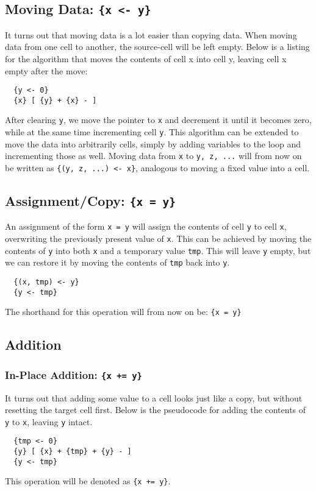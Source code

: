 \subsection{Moving Data: \texttt{\{x <- y\}}}
It turns out that moving data is a lot easier than copying data. When moving data from one cell to another, the source-cell will be left empty. Below is a listing for the algorithm that moves the contents of cell x into cell y, leaving cell x empty after the move:
\begin{lstlisting}
  {y <- 0} 
  {x} [ {y} + {x} - ]
\end{lstlisting}
After clearing \texttt{y}, we move the pointer to \texttt{x} and decrement it until it becomes zero, while at the same time incrementing cell \texttt{y}. This algorithm can be extended to move the data into arbitrarily cells, simply by adding variables to the loop and incrementing those as well. Moving data from \texttt{x} to \texttt{y, z, ...} will from now on be written as \texttt{\{(y, z, ...) <- x\}}, analogous to moving a fixed value into a cell.

\subsection{Assignment/Copy: \texttt{\{x = y\}}}
An assignment of the form \texttt{x = y} will assign the contents of cell \texttt{y} to cell \texttt{x}, overwriting the previously present value of \texttt{x}. This can be achieved by moving the contents of \texttt{y} into both \texttt{x} and a temporary value \texttt{tmp}. This will leave \texttt{y} empty, but we can restore it by moving the contents of \texttt{tmp} back into \texttt{y}.
\begin{lstlisting}
  {(x, tmp) <- y}
  {y <- tmp}
\end{lstlisting}
The shorthand for this operation will from now on be: \texttt{\{x = y\}}

\subsection{Addition}
\subsubsection{In-Place Addition: \texttt{\{x += y\}}}
It turns out that adding some value to a cell looks just like a copy, but without resetting the target cell first. Below is the pseudocode for adding the contents of \texttt{y} to \texttt{x}, leaving \texttt{y} intact.
\begin{lstlisting}
  {tmp <- 0}
  {y} [ {x} + {tmp} + {y} - ]
  {y <- tmp}
\end{lstlisting}
This operation will be denoted as \texttt{\{x += y\}}.

